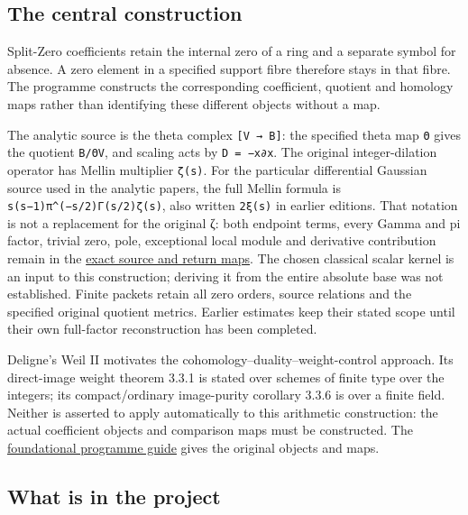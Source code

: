 \documentclass[
]{article}
\begin{document}
\subsection{The central construction}\label{the-central-construction}

Split-Zero coefficients retain the internal zero of a ring and a
separate symbol for absence. A zero element in a specified support fibre
therefore stays in that fibre. The programme constructs the
corresponding coefficient, quotient and homology maps rather than
identifying these different objects without a map.

The analytic source is the theta complex \texttt{{[}V\ →\ B{]}}: the
specified theta map \texttt{Θ} gives the quotient \texttt{B/ΘV}, and
scaling acts by \texttt{D\ =\ −x∂x}. The original integer-dilation
operator has Mellin multiplier \texttt{ζ(s)}. For the particular
differential Gaussian source used in the analytic papers, the full
Mellin formula is \texttt{s(s−1)π\^{}(−s/2)Γ(s/2)ζ(s)}, also written
\texttt{2ξ(s)} in earlier editions. That notation is not a replacement
for the original ζ: both endpoint terms, every Gamma and pi factor,
trivial zero, pole, exceptional local module and derivative contribution
remain in the
\href{https://github.com/KokunoYumeto/zeta-function-research-reader/blob/acd7016b8232a56f31ae3e69fb800571e8789080/workbenches/splitzero-tandem/continuations/20260923-retained-source-readers/original-zeta-full-boundary/independent/ORIGINAL_ZETA_THETA_CORRECTION.tex}{exact
source and return maps}. The chosen classical scalar kernel is an input
to this construction; deriving it from the entire absolute base was not
established. Finite packets retain all zero orders, source relations and
the specified original quotient metrics. Earlier estimates keep their
stated scope until their own full-factor reconstruction has been
completed.

Deligne's Weil II motivates the cohomology--duality--weight-control
approach. Its direct-image weight theorem 3.3.1 is stated over schemes
of finite type over the integers; its compact/ordinary image-purity
corollary 3.3.6 is over a finite field. Neither is asserted to apply
automatically to this arithmetic construction: the actual coefficient
objects and comparison maps must be constructed. The
\href{https://github.com/KokunoYumeto/zeta-function-research-reader/blob/main/RESEARCH_PROGRAMMES.md}{foundational
programme guide} gives the original objects and maps.

\subsection{What is in the project}\label{what-is-in-the-project}
\end{document}
